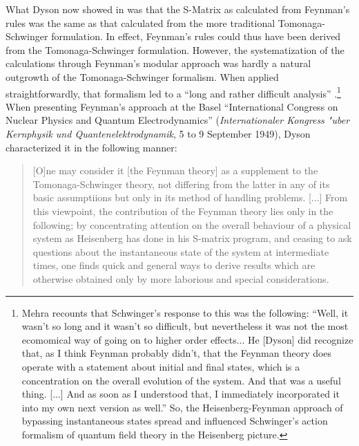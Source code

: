 \documentclass[12pt]{article}
\begin{document}
What Dyson now showed in \citep{dyson_1949_the-radiation} was that the S-Matrix as calculated from Feynman's rules was the same as that calculated from the more traditional Tomonaga-Schwinger formulation. In effect, Feynman's rules could thus have been derived from the Tomonaga-Schwinger formulation. However, the systematization of the calculations through Feynman's modular approach was hardly a natural outgrowth of the Tomonaga-Schwinger formalism. When applied straightforwardly, that formalism led to a ``long and rather difficult analysis'' \citep[p. 491]{dyson_1949_the-radiation}.\footnote{Mehra recounts that Schwinger's response to this was the following: ``Well, it wasn't so long and it wasn't so difficult, but nevertheless it was not the most ecomomical way of going on to higher order effects... He [Dyson] did recognize that, as I think Feynman probably didn't, that the Feynman theory does operate with a statement about initial and final states, which is a concentration on the overall evolution of the system. And that was a useful thing. [...] And as soon as I understood that, I immediately incorporated it into my own next version as well.'' \citep[p. 288n]{mehra_2000_climbing} So, the Heisenberg-Feynman approach of bypassing instantaneous states spread and influenced Schwinger's action formalism of quantum field theory in the Heisenberg picture.}  When presenting Feynman's approach at the Basel ``International Congress on Nuclear Physics and Quantum Electrodynamics'' (\emph{Internationaler Kongress "uber Kernphysik und Quantenelektrodynamik}, 5 to 9 September 1949), Dyson characterized it in the following manner:

\begin{quote}
[O]ne may consider it [the Feynman theory] as a supplement to the Tomonaga-Schwinger theory, not differing from the latter in any of its basic assumptiions but only in its method of handling problems. [...] From this viewpoint, the contribution of the Feynman theory lies only in the following; by concentrating attention on the overall behaviour of a physical system as Heisenberg has done in his S-matrix program, and ceasing to ask questions about the instantaneous state of the system at intermediate times, one finds quick and general ways to derive results which are otherwise obtained only by more laborious and special considerations.\citep[p. 240]{dyson_1950_the-radiation}
\end{quote}
\end{document}
